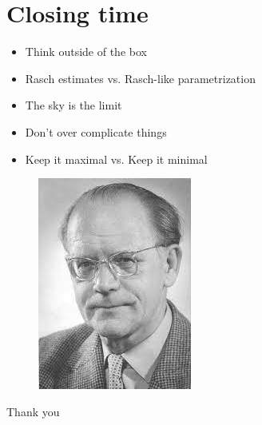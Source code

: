 \documentclass{beamer}
\begin{document}
\section{Closing time}
\begin{frame}

	
	{                                     %
		\setlength{\leftmargini}{0cm}         %
	
\begin{itemize}
		\large
	\item Think outside of the box
	
	\vspace{1.5mm}
	\item Rasch estimates vs. Rasch-like parametrization
	
	\vspace{1.5mm}
	\item The sky is the limit
	
	\vspace{1.5mm}
	\item Don't over complicate things 
	
	\vspace{1.5mm}
	\item Keep it maximal vs. Keep it minimal
\end{itemize}
	}                                     
\end{frame}

\begin{frame}[plain]
	\begin{figure}
		\centering
		\includegraphics[width=0.5\linewidth]{rasch}
	\end{figure}
	
	
	\begin{center}
\Huge

\textcolor{template}{Thank you}
	\end{center}
\end{frame}
\end{document}
